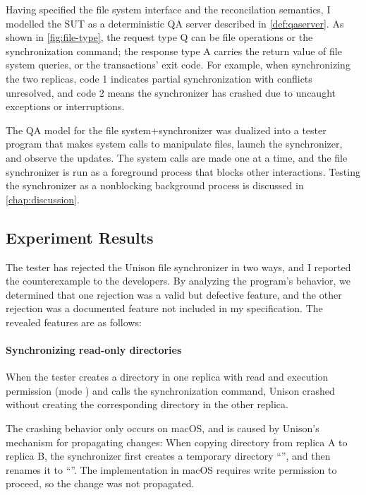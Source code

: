 Having specified the file system interface and the reconcilation semantics, I
modelled the SUT as a deterministic QA server described in
\autoref{def:qaserver}.  As shown in \autoref{fig:file-type}, the request type
\ilc Q can be file operations or the synchronization command; the response type
\ilc A carries the return value of file system queries, or the transactions'
exit code.  For example, when synchronizing the two replicas, code 1 indicates
partial synchronization with conflicts unresolved, and code 2 means the
synchronizer has crashed due to uncaught exceptions or interruptions.

The QA model for the file system+synchronizer was dualized into a tester program
that makes system calls to manipulate files, launch the synchronizer, and
observe the updates.  The system calls are made one at a time, and the file
synchronizer is run as a foreground process that blocks other interactions.
Testing the synchronizer as a nonblocking background process is discussed in
\autoref{chap:discussion}.

\subsection{Experiment Results}
\label{sec:file-result}
The tester has rejected the Unison file synchronizer in two ways, and I reported
the counterexample to the developers.  By analyzing the program's behavior, we
determined that one rejection was a valid but defective feature, and the other
rejection was a documented feature not included in my specification.  The
revealed features are as follows:

\paragraph{Synchronizing read-only directories}
When the tester creates a directory in one replica with read and execution
permission (mode ) and calls the synchronization command, Unison
crashed without creating the corresponding directory in the other replica.

The crashing behavior only occurs on macOS, and is caused by Unison's mechanism
for propagating changes: When copying directory  from replica \ilj A to
replica \ilj B, the synchronizer first creates a temporary directory
``'', and then renames it to ``''.
The  implementation in macOS requires write permission to
proceed, so the change was not propagated.

